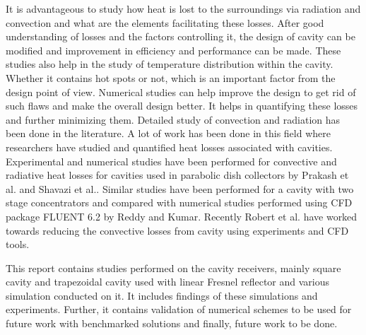 It is advantageous to study how heat is lost to the surroundings via radiation and convection and what are the elements facilitating these losses. After good understanding of losses and the factors controlling it, the design of cavity can be modified and improvement in efficiency and performance can be made. These studies also help in the study of temperature distribution within the cavity. Whether it contains hot spots or not, which is an important factor from the design point of view. Numerical studies can help improve the design to get rid of such flaws and make the overall design better. It helps in quantifying these losses and further minimizing them. Detailed study of convection and radiation has been done in the literature.  A lot of work has been done in this field where researchers have studied and quantified heat losses associated with cavities. Experimental and numerical studies have been performed for convective and radiative heat losses for cavities used in parabolic dish collectors by Prakash et al.\citep{PRAKASH2009157} and Shavazi et al.\citep{ABBASISHAVAZI2015269}. Similar studies have been performed for a cavity with two stage concentrators and compared with numerical studies performed using CFD package FLUENT 6.2 by Reddy and Kumar\citep{Reddy2009}. Recently Robert et al.\citep{doi:10.1063/1.4949066} have worked towards reducing the convective losses from cavity using experiments and CFD tools.

This report contains studies performed on the cavity receivers, mainly square cavity and trapezoidal cavity used with linear Fresnel reflector and various simulation conducted on it. It includes findings of these simulations and experiments. Further, it contains validation of numerical schemes to be used for future work with benchmarked solutions and finally, future work to be done.
